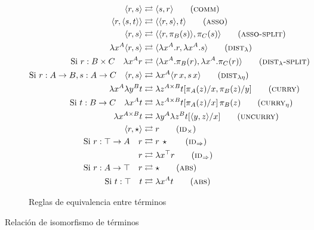 \begin{figure}[H]
	\centering
	\begin{align}
		\langle r,s \rangle &\rightleftarrows \langle s,r \rangle \tag{\textsc{comm}} \\
		\langle r, \langle s,t \rangle \rangle &\rightleftarrows \langle \langle r, s \rangle, t \rangle 	\tag{\textsc{asso}} \\
		\langle r, s \rangle &\rightleftarrows \langle \langle r, \pi_B (s) \rangle, \pi_C (s) \rangle 	\tag{\textsc{asso-split}} \\
		\lambda x^A \langle r,s \rangle &\rightleftarrows \langle \lambda x^A.r, \lambda x^A.s \rangle 	\tag{$\textsc{dist}_{\lambda}$} \\
		\text{Si } r: B \times C \quad \lambda x^A r &\rightleftarrows \langle \lambda x^A. \pi_B(r), \lambda x^A.\pi_C(r) \rangle \tag{$\textsc{dist}_{\lambda}\textsc{-split}$} \\
		\text{Si } r: A \rightarrow B, s : A \rightarrow C \quad \langle r,s \rangle &\rightleftarrows \lambda x^A \langle r \, x,s \, x \rangle \tag{$\textsc{dist}_{\lambda\eta}$} \\
		\lambda x^A \lambda y^B t &\rightleftarrows \lambda z^{A \times B} t[\pi_A(z)/x, \pi_B(z)/y]
		\tag{\textsc{curry}} \\
		\text{Si } t: B \rightarrow C \quad \lambda x^A t &\rightleftarrows \lambda z^{A \times B} t[\pi_A(z)/x]\, \pi_B(z) \tag{$\textsc{curry}_{\eta}$} \\
		\lambda x^{A \times B} t &\rightleftarrows \lambda y^A \lambda z^B t[\langle y, z \rangle/x] \tag{\textsc{uncurry}} \\
		\langle r, \star \rangle &\rightleftarrows r \tag{$\textsc{id}_\times$} \\
		\text{Si } r: \top \rightarrow A \quad r &\rightleftarrows r \, \star \tag{$\textsc{id}_\Rightarrow$} \\
		r &\rightleftarrows \lambda x^\top r \tag{$\textsc{id}_\Rightarrow$} \\
		\text{Si } r: A \rightarrow \top \quad r &\rightleftarrows \star \tag{\textsc{abs}} \\
		\text{Si } t: \top \quad t &\rightleftarrows \lambda x^A t \tag{\textsc{abs}}
	\end{align}
	
	\caption{Reglas de equivalencia entre términos}
\end{figure}

\begin{codigo}
	Relación de isomorfismo de términos
	
\end{codigo}

